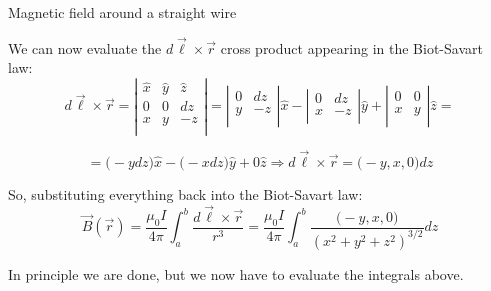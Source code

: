 %
%
%

\begin{frame}{Magnetic field around a straight wire}

We can now evaluate the $d\vec{\ell} \times \vec{r}$ cross product appearing in the Biot-Savart law:\\
\begin{equation*}
  d\vec{\ell} \times \vec{r} =
   \left|
    \begin{array}{ccc}
      \hat{x} & \hat{y} & \hat{z} \\
            0 &       0 &      dz \\
            x &       y &      -z \\
    \end{array}
   \right|
   =
   \left|
    \begin{array}{cc}
            0 &  dz \\
            y &  -z \\
    \end{array}
   \right|
   \hat{x} -
   \left|
    \begin{array}{cc}
            0 &  dz \\
            x &  -z \\
    \end{array}
   \right|
   \hat{y} +
   \left|
    \begin{array}{cc}
            0 &  0 \\
            x &  y \\
    \end{array}
   \right|
   \hat{z} =
\end{equation*}

\begin{equation*}
  = \Big( -y dz \Big) \hat{x} - \Big( -x dz \Big) \hat{y} + 0 \hat{z} \Rightarrow
  d\vec{\ell} \times \vec{r} = \Big(-y, x, 0 \Big) dz
\end{equation*}

So, substituting everything back into the Biot-Savart law:
\begin{equation*}
  \vec{B}(\vec{r}) =
     \frac{\mu_0I}{4\pi} \int_{a}^{b} \frac{d\vec{\ell} \times \vec{r}}{r^3} =
     \frac{\mu_0I}{4\pi} \int_{a}^{b} \frac{\Big(-y, x, 0 \Big)}{(x^2+y^2+z^2)^{3/2}} dz
\end{equation*}

In principle we are done, but we now have to evaluate the integrals above.

\end{frame}

